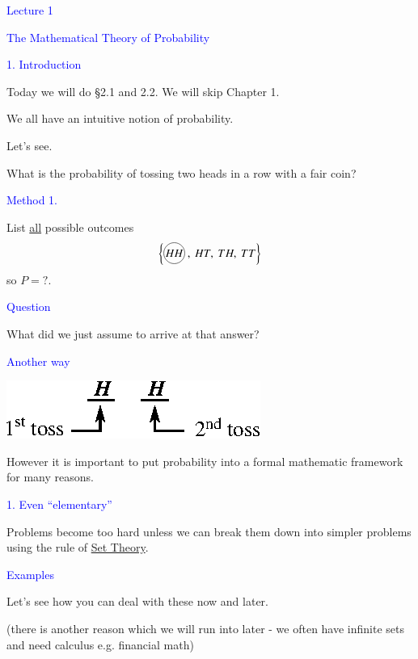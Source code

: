 \documentclass[landscape]{slides}
\newcommand*\mycirc[1]{%
  \tikz[baseline=(C.base)]\node[draw,circle,inner sep=.7pt](C) {#1};\:
}
\begin{document}
\begin{slide}
\begin{center}
\textcolor{blue}{\huge{Lecture 1}}

\textcolor{blue}{\Large{The Mathematical Theory of Probability}}

\textcolor{blue}{\large{1. Introduction}}
\end{center}

Today we will do \S2.1 and 2.2. We will skip Chapter 1.

We all have an intuitive notion of probability.

Let's see.

What is the probability of tossing two heads in a row with a fair coin?
\end{slide}

\begin{slide} 
\textcolor{blue}{\large{Method 1.}}

List \underline{all} possible outcomes 
$$
\left\{\mycirc{$HH$}, \ HT, \ TH, \ TT\right\}
$$
so $P=?$.

\medskip
\textcolor{blue}{\large{Question}}

What did we just assume to arrive at that answer?
\end{slide}

\begin{slide}
\textcolor{blue}{\large{Another way}}

\bigskip

\centerline{\includegraphics[scale=2]{fig1.eps}}

However it is important to put probability into a formal mathematic framework for many reasons. 
\end{slide}

\begin{slide}
\textcolor{blue}{\large{1. Even ``elementary''}}

Problems become too hard unless we can break them down into simpler problems using the rule of \underline{Set Theory}.

\medskip

\textcolor{blue}{\large{Examples}}

Let's see how you can deal with these now and later.

(there is another reason which we will run into later - we often have infinite sets and need calculus e.g. financial math)
\end{slide}
\end{document}
